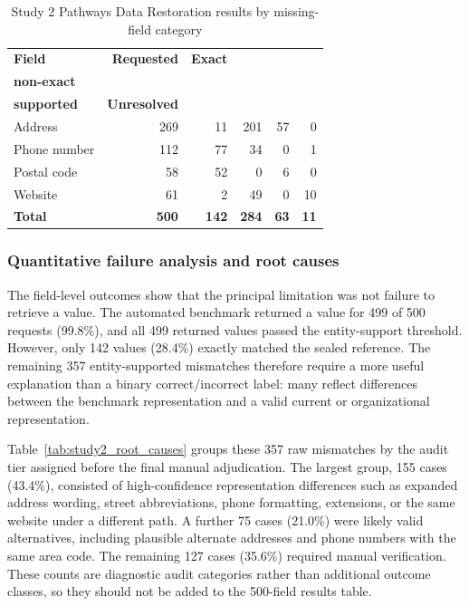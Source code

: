 \documentclass[12pt,oneside]{report}
\begin{document}
\begin{table}[H]
\caption{Study 2 Pathways Data Restoration results by missing-field category}
\label{tab:study2_results}
\centering
\small
\begin{tabularx}{\textwidth}{@{}Xrrrrr@{}}
\toprule
\textbf{Field} & \textbf{Requested} & \textbf{Exact} & \makecell{\textbf{Supported,}\\\textbf{non-exact}} & \makecell{\textbf{Weakly}\\\textbf{supported}} & \textbf{Unresolved} \\
\midrule
Address & 269 & 11 & 201 & 57 & 0 \\
Phone number & 112 & 77 & 34 & 0 & 1 \\
Postal code & 58 & 52 & 0 & 6 & 0 \\
Website & 61 & 2 & 49 & 0 & 10 \\
\textbf{Total} & \textbf{500} & \textbf{142} & \textbf{284} & \textbf{63} & \textbf{11} \\
\bottomrule
\end{tabularx}
\end{table}

\subsubsection{Quantitative failure analysis and root causes}
The field-level outcomes show that the principal limitation was not failure to retrieve a value. The automated benchmark returned a value for 499 of 500 requests (99.8\%), and all 499 returned values passed the entity-support threshold. However, only 142 values (28.4\%) exactly matched the sealed reference. The remaining 357 entity-supported mismatches therefore require a more useful explanation than a binary correct/incorrect label: many reflect differences between the benchmark representation and a valid current or organizational representation.

Table~\ref{tab:study2_root_causes} groups these 357 raw mismatches by the audit tier assigned before the final manual adjudication. The largest group, 155 cases (43.4\%), consisted of high-confidence representation differences such as expanded address wording, street abbreviations, phone formatting, extensions, or the same website under a different path. A further 75 cases (21.0\%) were likely valid alternatives, including plausible alternate addresses and phone numbers with the same area code. The remaining 127 cases (35.6\%) required manual verification. These counts are diagnostic audit categories rather than additional outcome classes, so they should not be added to the 500-field results table.
\end{document}
